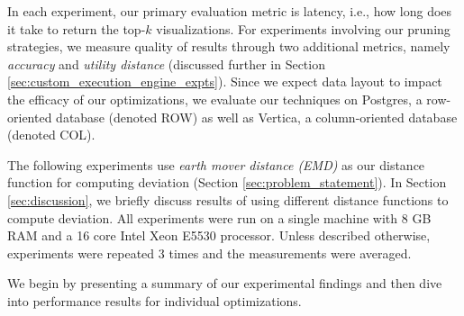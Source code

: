In each experiment, our primary evaluation metric is latency, i.e., 
how long does it take \SeeDB to return the top-$k$ visualizations. 
For experiments involving our pruning strategies, we measure quality of results through two additional
metrics, namely {\it accuracy} and {\it utility distance} (discussed further in Section 
\ref{sec:custom_execution_engine_expts}).
Since we expect data layout to impact the efficacy of our optimizations, we 
evaluate our techniques on Postgres, a row-oriented database (denoted ROW) as well as Vertica, 
a column-oriented database (denoted COL).

The following experiments use {\it earth mover distance (EMD)} as our distance function for
computing deviation (Section \ref{sec:problem_statement}).
In Section \ref{sec:discussion}, we briefly discuss results of using different distance functions to
compute deviation.
All experiments were run on a single machine with 8 GB RAM and a 16 core Intel 
Xeon E5530 processor. 
Unless described otherwise, experiments were repeated 3 times and the measurements 
were averaged.

We begin by presenting a summary of our experimental findings and then dive into performance results 
for individual optimizations.













